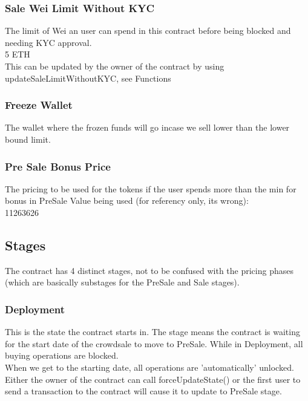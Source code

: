 \documentclass[11pt]{article} %
\begin{document}
\subsubsection{Sale Wei Limit Without KYC}
The limit of Wei an user can spend in this contract before being blocked and needing KYC approval.\\
5 ETH\\
This can be updated by the owner of the contract by using updateSaleLimitWithoutKYC, see Functions


\subsubsection{Freeze Wallet}
The wallet where the frozen funds will go incase we sell lower than the lower bound limit.


\subsubsection{Pre Sale Bonus Price}
The pricing to be used for the tokens if the user spends more than the min for bonus in PreSale
Value being used (for referency only, its wrong): \\
11263626

\subsection{Stages}
The contract has 4 distinct stages, not to be confused with the pricing phases (which are basically substages for the PreSale and Sale stages).

\subsubsection{Deployment}
This is the state the contract starts in. The stage means the contract is waiting for the start date of the crowdsale to move to PreSale.
While in Deployment, all buying operations are blocked.\\
When we get to the starting date, all operations are 'automatically' unlocked. Either the owner of the contract can call forceUpdateState() or the first user to send a transaction to the contract will cause it to update to PreSale stage.
\end{document}
